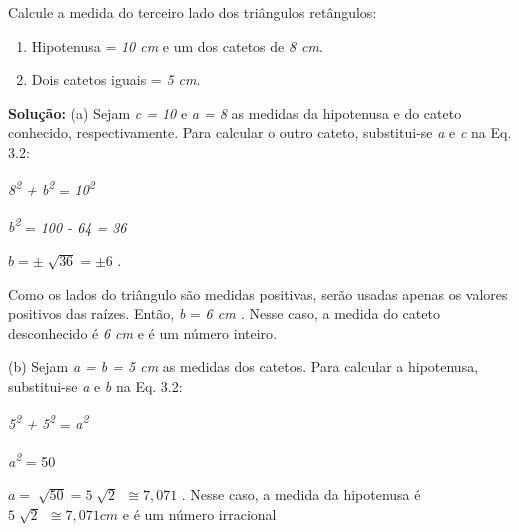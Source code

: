 \begin{texemplo}
Calcule a medida do terceiro lado dos triângulos retângulos:

\begin{enumerate}
    \item Hipotenusa = \textit{10 cm} e um dos catetos de \textit{8 cm}.

    \item Dois catetos iguais = \textit{5 cm}.
\end{enumerate}

\textbf{Solução:} (a) Sejam \textit{c = 10}  e  \textit{a = 8} as medidas da hipotenusa e do cateto conhecido, respectivamente. Para calcular o outro cateto, substitui-se \textit{a }e\textit{ c} na Eq. 3.2:

\textit{8\textsuperscript{2} + b\textsuperscript{2} }= \textit{ 10\textsuperscript{2}  }

\textit{b\textsuperscript{2} }= \textit{ 100  -  64 = 36 }

 \( b= \pm \sqrt[]{36}= \pm 6  \) .

Como os lados do triângulo são medidas positivas, serão usadas apenas os valores positivos das raízes. Então, \textit{b }= \textit{ 6 cm . }Nesse caso, a medida do cateto desconhecido é\textit{ 6 cm  }e é um número inteiro\textit{.}

(b) Sejam \textit{a =  b = 5 cm } as medidas dos catetos. Para calcular a hipotenusa, substitui-se \textit{a }e\textit{ b} na Eq. 3.2:

\textit{5\textsuperscript{2} + 5\textsuperscript{2} }= \textit{ a\textsuperscript{2}  }

\textit{a\textsuperscript{2}} = 50

 \( a=\sqrt[]{50}=5\sqrt[]{2}~~ \cong   7,071 \)  . Nesse caso, a medida da hipotenusa é   \( 5\sqrt[]{2}~~ \cong   7,071 cm \)   e é um número irracional\textit{ \qedsymbol}
\end{texemplo}

